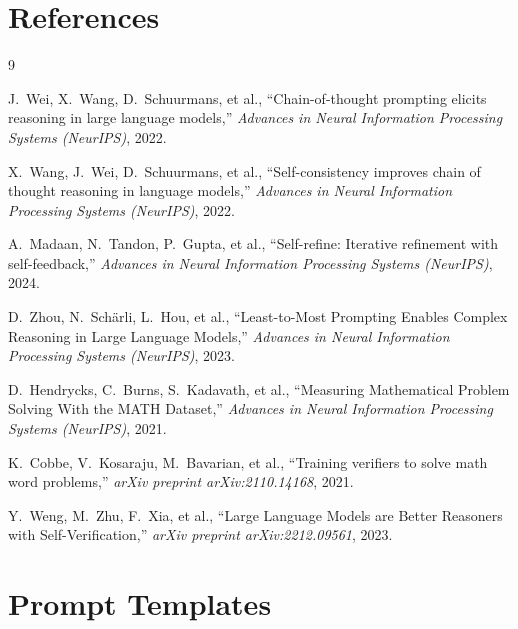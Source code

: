 \documentclass[conference]{IEEEtran}
\begin{document}
\section*{References}

\begin{thebibliography}{9}

J.~Wei, X.~Wang, D.~Schuurmans, et al.,
``Chain-of-thought prompting elicits reasoning in large language models,''
\textit{Advances in Neural Information Processing Systems (NeurIPS)}, 2022.

X.~Wang, J.~Wei, D.~Schuurmans, et al.,
``Self-consistency improves chain of thought reasoning in language models,''
\textit{Advances in Neural Information Processing Systems (NeurIPS)}, 2022.

A.~Madaan, N.~Tandon, P.~Gupta, et al.,
``Self-refine: Iterative refinement with self-feedback,''
\textit{Advances in Neural Information Processing Systems (NeurIPS)}, 2024.

D.~Zhou, N.~Sch\"{a}rli, L.~Hou, et al.,
``Least-to-Most Prompting Enables Complex Reasoning in Large Language Models,''
\textit{Advances in Neural Information Processing Systems (NeurIPS)}, 2023.

D.~Hendrycks, C.~Burns, S.~Kadavath, et al.,
``Measuring Mathematical Problem Solving With the MATH Dataset,''
\textit{Advances in Neural Information Processing Systems (NeurIPS)}, 2021.

K.~Cobbe, V.~Kosaraju, M.~Bavarian, et al.,
``Training verifiers to solve math word problems,''
\textit{arXiv preprint arXiv:2110.14168}, 2021.

Y.~Weng, M.~Zhu, F.~Xia, et al.,
``Large Language Models are Better Reasoners with Self-Verification,''
\textit{arXiv preprint arXiv:2212.09561}, 2023.

\end{thebibliography}

\appendices

\section{Prompt Templates}
\label{sec:prompts}
\end{document}
